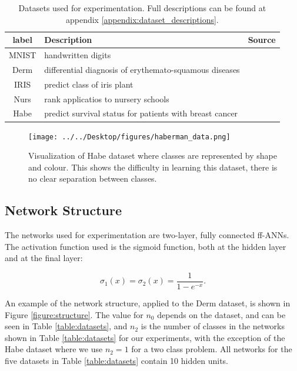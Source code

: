 \documentclass[letterpaper,12pt,titlepage,oneside,final]{book}
\begin{document}
	\begin{table}[h]
		\begin{center}
			\begin{tabular}{ |c|l|c| }  
				\hline
				\textbf{label} & \textbf{Description} & \textbf{Source}\\
				\hline
				MNIST & handwritten digits & \cite{mnist}\\
				\hline
				Derm & differential diagnosis of erythemato-squamous diseases & \cite{Derm}\\
				\hline
				IRIS & predict class of iris plant & \cite{IRIS}\\
				\hline
				Nurs & rank applicatios to nursery schools & \cite{Nurs}\\
				\hline
				Habe & predict survival status for patients with breast cancer  & \cite{Habe}\\ 
				\hline
			\end{tabular}
		\end{center}
		\caption{Datasets used for experimentation. Full descriptions can be found at appendix \ref{appendix:dataset_descriptions}.}
		\label{table:datasettopics}
	\end{table}
	
	\begin{figure}[h]
		\centering
		\texttt{[image: ../../Desktop/figures/haberman\_data.png]}
		\caption{Visualization of Habe dataset where classes are represented by shape and colour. This shows the difficulty in learning this dataset, there is no clear separation between classes.}
		\label{figure:haberman}
	\end{figure}
	
	
	\subsection{Network Structure}
	
	The networks used for experimentation are two-layer, fully connected ff-ANNs. The activation function used is the sigmoid function, both at the hidden layer and at the final layer:
	
	\begin{equation}
	\sigma_{1}(x) = \sigma_{2}(x) = \frac{1}{1 - e^{-x}}.
	\end{equation}
	
	An example of the network structure, applied to the Derm dataset, is shown in Figure \ref{figure:structure}. The value for $n_{0}$ depends on the dataset, and can be seen in Table \ref{table:datasets}, and $n_{2}$ is the number of classes in the networks shown in Table
	\ref{table:datasets} for our experiments, with the exception of the Habe dataset where we use $n_{2} = 1$ for a two class problem. All networks for the five datasets in Table \ref{table:datasets} contain 10 hidden units. 
	
\end{document}
